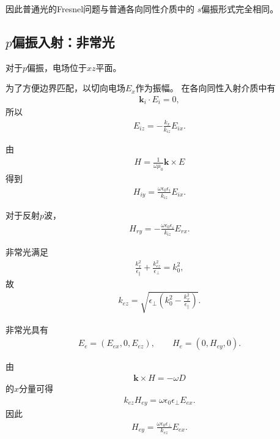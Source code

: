 \documentclass{article}
\begin{document}
因此普通光的Fresnel问题与普通各向同性介质中的
$s$偏振形式完全相同。

\subsection{$p$偏振入射：非常光}

对于$p$偏振，电场位于$xz$平面。

为了方便边界匹配，以切向电场$E_x$作为振幅。
在各向同性入射介质中有
\begin{align}
    \mathbf k_i\cdot E_i=0,
\end{align}
所以
\begin{align}
    E_{iz}
    =
    -\frac{k_x}{k_{iz}}E_{ix}.
\end{align}

由
\begin{align}
    H
    =
    \frac{1}{\omega\mu_0}
    \mathbf k\times E
\end{align}
得到
\begin{align}
    H_{iy}
    =
    \frac{\omega\epsilon_0\epsilon_i}
    {k_{iz}}E_{ix}.
\end{align}

对于反射$p$波，
\begin{align}
    H_{ry}
    =
    -\frac{\omega\epsilon_0\epsilon_i}
    {k_{iz}}E_{rx}.
\end{align}

非常光满足
\begin{align}
    \frac{k_x^2}{\epsilon_\parallel}
    +
    \frac{k_{ez}^2}{\epsilon_\perp}
    =
    k_0^2,
\end{align}
故
\begin{align}
    \boxed{
    k_{ez}
    =
    \sqrt{
    \epsilon_\perp
    \left(
    k_0^2
    -
    \frac{k_x^2}{\epsilon_\parallel}
    \right)
    }
    }.
\end{align}

非常光具有
\begin{align}
    E_e=(E_{ex},0,E_{ez}),
    \qquad
    H_e=(0,H_{ey},0).
\end{align}

由
\begin{align}
    \mathbf k\times H
    =
    -\omega D
\end{align}
的$x$分量可得
\begin{align}
    k_{ez}H_{ey}
    =
    \omega\epsilon_0\epsilon_\perp E_{ex}.
\end{align}
因此
\begin{align}
    H_{ey}
    =
    \frac{\omega\epsilon_0\epsilon_\perp}
    {k_{ez}}
    E_{ex}.
\end{align}
\end{document}
